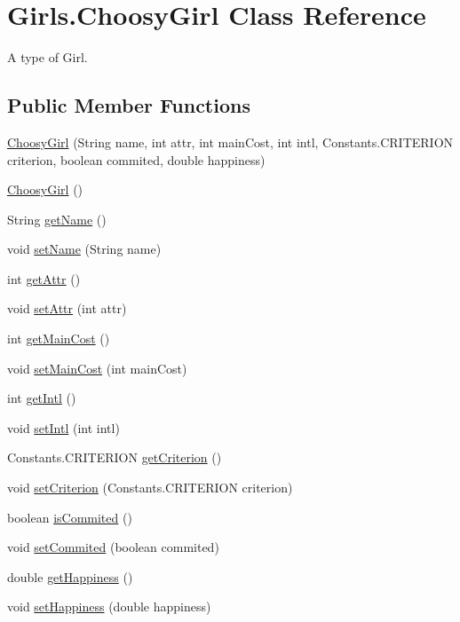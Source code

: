\hypertarget{class_girls_1_1_choosy_girl}{}\section{Girls.\+Choosy\+Girl Class Reference}
\label{class_girls_1_1_choosy_girl}


A type of Girl.  


\subsection*{Public Member Functions}
\begin{DoxyCompactItemize}
\item 
\hyperlink{class_girls_1_1_choosy_girl_ae2eea627b7e0cff8d4bdd2eef95fec10}{Choosy\+Girl} (String name, int attr, int main\+Cost, int intl, Constants.\+C\+R\+I\+T\+E\+R\+I\+ON criterion, boolean commited, double happiness)
\item 
\hyperlink{class_girls_1_1_choosy_girl_a832f2a6b8040c2a65e408a0a3ef26fc3}{Choosy\+Girl} ()
\item 
String \hyperlink{class_girls_1_1_choosy_girl_a77ed5e6bf6c765c59a837e941f9bf4c0}{get\+Name} ()
\item 
void \hyperlink{class_girls_1_1_choosy_girl_aacfa276ca7d9668f3b51a4e6c05577d5}{set\+Name} (String name)
\item 
int \hyperlink{class_girls_1_1_choosy_girl_a86850997d141237b2cffb18af4a07c11}{get\+Attr} ()
\item 
void \hyperlink{class_girls_1_1_choosy_girl_a2757fcbc17232a81347e613f6ba8e544}{set\+Attr} (int attr)
\item 
int \hyperlink{class_girls_1_1_choosy_girl_a03eab0f0e9e326059900c88f25d04acf}{get\+Main\+Cost} ()
\item 
void \hyperlink{class_girls_1_1_choosy_girl_a0bb45a2353bc83496229f2874900c317}{set\+Main\+Cost} (int main\+Cost)
\item 
int \hyperlink{class_girls_1_1_choosy_girl_ad39f5e11375a16473289d58b11f1e3ed}{get\+Intl} ()
\item 
void \hyperlink{class_girls_1_1_choosy_girl_ad94e9db0029eeaddc1f2fd8015894b95}{set\+Intl} (int intl)
\item 
Constants.\+C\+R\+I\+T\+E\+R\+I\+ON \hyperlink{class_girls_1_1_choosy_girl_a2fc874b64673cd3da84a3fed95795586}{get\+Criterion} ()
\item 
void \hyperlink{class_girls_1_1_choosy_girl_a5a9648357e161d044dbc2fa961156892}{set\+Criterion} (Constants.\+C\+R\+I\+T\+E\+R\+I\+ON criterion)
\item 
boolean \hyperlink{class_girls_1_1_choosy_girl_a670a58571cbfc327878255075654d8f9}{is\+Commited} ()
\item 
void \hyperlink{class_girls_1_1_choosy_girl_a4915bf2cc8b3ecec7f6872646aa1e103}{set\+Commited} (boolean commited)
\item 
double \hyperlink{class_girls_1_1_choosy_girl_a188666414ad317856691a47a4c518208}{get\+Happiness} ()
\item 
void \hyperlink{class_girls_1_1_choosy_girl_a1f59a315a6c00c3f682ba71bf655bafb}{set\+Happiness} (double happiness)
\end{DoxyCompactItemize}
